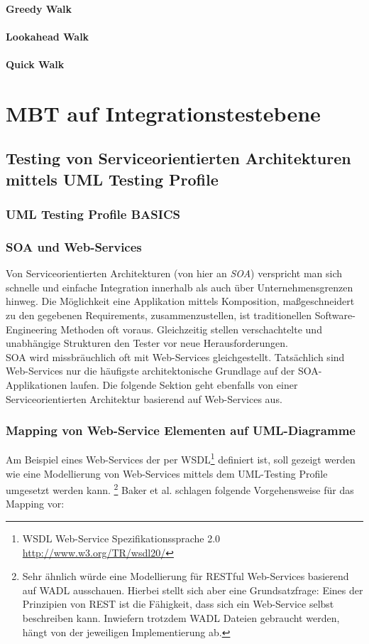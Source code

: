 \paragraph{Greedy Walk}
\paragraph{Lookahead Walk}
\paragraph{Quick Walk}


\section{MBT auf Integrationstestebene}
\subsection{Testing von Serviceorientierten Architekturen mittels UML Testing Profile}

\subsubsection{UML Testing Profile BASICS}

\subsubsection{SOA und Web-Services}
Von Serviceorientierten Architekturen (von hier an \textit{SOA}) verspricht man sich schnelle und einfache Integration innerhalb als auch über Unternehmensgrenzen hinweg. Die Möglichkeit eine Applikation mittels Komposition, maßgeschneidert zu den gegebenen Requirements, zusammenzustellen, ist traditionellen Software-Engineering Methoden oft voraus. Gleichzeitig stellen verschachtelte und unabhängige Strukturen den Tester vor neue Herausforderungen. \\
SOA wird missbräuchlich oft mit Web-Services gleichgestellt. Tatsächlich sind Web-Services nur die häufigste architektonische Grundlage auf der SOA-Applikationen laufen. Die folgende Sektion geht ebenfalls von einer Serviceorientierten Architektur basierend auf Web-Services aus.

\subsubsection{Mapping von Web-Service Elementen auf UML-Diagramme}
Am Beispiel eines Web-Services der per WSDL\footnote{WSDL Web-Service Spezifikationssprache 2.0 \url{http://www.w3.org/TR/wsdl20/}} definiert ist, soll gezeigt werden wie eine Modellierung von Web-Services mittels dem UML-Testing Profile umgesetzt werden kann. \footnote{Sehr ähnlich würde eine Modellierung für RESTful Web-Services basierend auf WADL ausschauen. Hierbei stellt sich aber eine Grundsatzfrage: Eines der Prinzipien von REST ist die Fähigkeit, dass sich ein Web-Service selbst beschreiben kann. Inwiefern trotzdem WADL Dateien gebraucht werden, hängt von der jeweiligen Implementierung ab.} Baker et al. schlagen folgende Vorgehensweise für das Mapping vor\cite{_model-driven_2007}:

